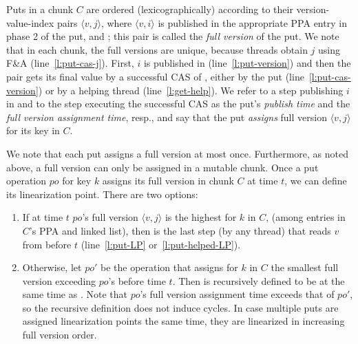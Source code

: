 Puts in a chunk $C$
are ordered (lexicographically) according to their version-value-index   pairs $\langle v, j \rangle$, where
$\langle v, i \rangle$ is published in the appropriate  PPA entry in phase 2 of the put, and ; this pair is called the \emph{full version} of the put.
We note that in each chunk, the full versions are unique, because threads obtain $j$ using F\&A (line~\ref{l:put-cas-j}).
First,  $i$ is published in  (line~\ref{l:put-version}) and then
the  pair gets its final value by a successful CAS of , either by the put (line~\ref{l:put-cas-version}) or by a helping thread (line~\ref {l:get-help}). 
We refer to 
a step publishing $i$ in  and to
the step executing the successful CAS  as the put's \emph{publish time} and the \emph{full version assignment time}, resp., 
and say that the put \emph{assigns} full version $\langle v, j \rangle$ for its key in $C$.

We note that each put assigns a full version at most once. 
Furthermore, as noted above, a full version can only be assigned in a mutable chunk.
Once a put operation $po$ for key $k$ assigns its full version in chunk $C$ at time $t$, we can define its linearization point. 
There are two options: 
\begin{enumerate}
\item If at time $t$
$po$'s full version $\langle v, j \rangle$ is the highest for $k$ in $C$, (among entries in $C$'s {PPA} and  linked list),
then   is the last step (by any thread) that reads $v$ from  before $t$ (line~\ref{l:put-LP} or~\ref{l:put-helped-LP}). 
\item  Otherwise, let $po'$ be the 
 operation that assigns for $k$ in $C$ the smallest full version exceeding $po$'s
before time $t$. Then  is recursively defined to be at the same time as . Note that 
$po$'s full version assignment time exceeds that of  $po'$, so the recursive definition does not induce cycles. 
In case multiple puts are assigned linearization points the same time, they are linearized in increasing full version order.
\end{enumerate}




